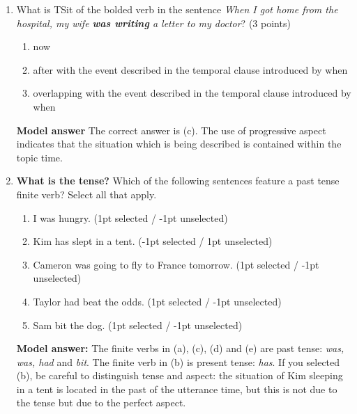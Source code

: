 \documentclass[a4,11pt]{article}
\newcommand{\6}{\mbox{$[\hspace*{-.6mm}[$}}
\newcommand{\9}{\mbox{$]\hspace*{-.6mm}]$}}
\begin{document}
\begin{enumerate}[leftmargin = 12pt]
\begin{enumerate}[noitemsep]
\item now
\item after with the event described in the temporal clause introduced by when
\item overlapping with the event described in  the temporal clause introduced by when
\end{enumerate}

{\bf Model answer} The correct answer is (b).

\item What is TSit of the bolded verb in the sentence \textit{When I got home from the hospital, my wife {\bf was writing} a letter to my doctor}?  (3 points)

\begin{enumerate}[noitemsep]
\item now
\item after with the event described in the temporal clause introduced by when
\item overlapping with the event described in the temporal clause introduced by when
\end{enumerate}


{\bf Model answer} The correct answer is (c). The use of progressive aspect indicates that the situation which is being described is contained within the topic time.


\item {\bf What is the tense?} Which of the following sentences feature a past tense finite verb? Select all that apply.

\begin{enumerate}[noitemsep]

\item I was hungry.  (1pt selected / -1pt unselected)

\item Kim has slept in a tent. (-1pt selected / 1pt unselected)

\item Cameron was going to fly to France tomorrow. (1pt selected / -1pt unselected)

\item Taylor had beat the odds. (1pt selected / -1pt unselected)

\item Sam bit the dog. (1pt selected / -1pt unselected)

\end{enumerate}

{\bf Model answer:} The finite verbs in (a), (c), (d) and (e) are past tense: {\em was, was, had} and {\em bit}. The finite verb in (b) is present tense: {\em has}. If you selected (b), be careful to distinguish tense and aspect: the situation of Kim sleeping in a tent is located in the past of the utterance time, but this is not due to the tense but due to the perfect aspect.

\end{enumerate}
\end{document}
